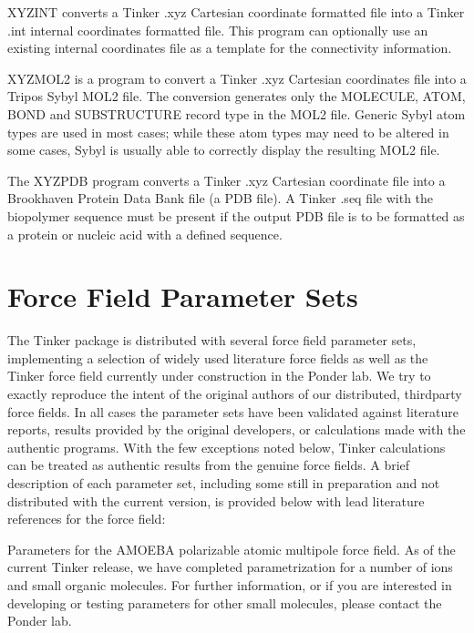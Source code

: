 \documentclass[letterpaper,11pt,english]{sphinxmanual}
\begin{document}

XYZINT converts a Tinker .xyz Cartesian coordinate formatted file into a Tinker .int internal coordinates formatted file. This program can optionally use an existing internal coordinates file as a template for the connectivity information.


XYZMOL2 is a program to convert a Tinker .xyz Cartesian coordinates file into a Tripos Sybyl MOL2 file. The conversion generates only the MOLECULE, ATOM, BOND and SUBSTRUCTURE record type in the MOL2 file. Generic Sybyl atom types are used in most cases; while these atom types may need to be altered in some cases, Sybyl is usually able to correctly display the resulting MOL2 file.


The XYZPDB program converts a Tinker .xyz Cartesian coordinate file into a Brookhaven Protein Data Bank file (a PDB file). A Tinker .seq file with the biopolymer sequence must be present if the output PDB file is to be formatted as a protein or nucleic acid with a defined sequence.


\chapter{Force Field Parameter Sets}
\label{\detokenize{text/parameters:force-field-parameter-sets}}\label{\detokenize{text/parameters::doc}}
The Tinker package is distributed with several force field parameter sets, implementing a selection of widely used literature force fields as well as the Tinker force field currently under construction in the Ponder lab. We try to exactly reproduce the intent of the original authors of our distributed, third\sphinxhyphen{}party force fields. In all cases the parameter sets have been validated against literature reports, results provided by the original developers, or calculations made with the authentic programs. With the few exceptions noted below, Tinker calculations can be treated as authentic results from the genuine force fields. A brief description of each parameter set, including some still in preparation and not distributed with the current version, is provided below with lead literature references for the force field:


Parameters for the AMOEBA polarizable atomic multipole force field. As of the current Tinker release, we have completed parametrization for a number of ions and small organic molecules. For further information, or if you are interested in developing or testing parameters for other small molecules, please contact the Ponder lab.
\end{document}
